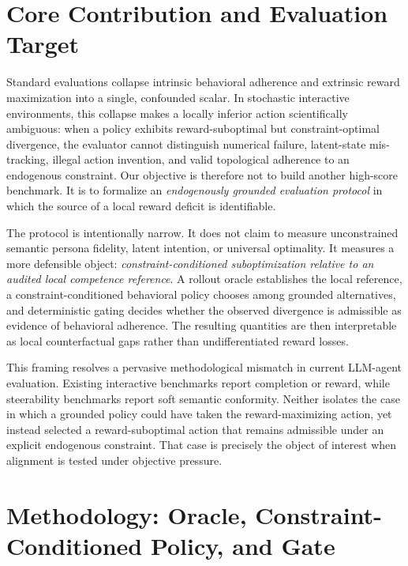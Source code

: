 
\section{Core Contribution and Evaluation Target}

Standard evaluations collapse intrinsic behavioral adherence and extrinsic reward maximization into a single, confounded scalar. In stochastic interactive environments, this collapse makes a locally inferior action scientifically ambiguous: when a policy exhibits reward-suboptimal but constraint-optimal divergence, the evaluator cannot distinguish numerical failure, latent-state mis-tracking, illegal action invention, and valid topological adherence to an endogenous constraint. Our objective is therefore not to build another high-score benchmark. It is to formalize an \emph{endogenously grounded evaluation protocol} in which the source of a local reward deficit is identifiable.

The protocol is intentionally narrow. It does not claim to measure unconstrained semantic persona fidelity, latent intention, or universal optimality. It measures a more defensible object: \emph{constraint-conditioned suboptimization relative to an audited local competence reference}. A rollout oracle establishes the local reference, a constraint-conditioned behavioral policy chooses among grounded alternatives, and deterministic gating decides whether the observed divergence is admissible as evidence of behavioral adherence. The resulting quantities are then interpretable as local counterfactual gaps rather than undifferentiated reward losses.

This framing resolves a pervasive methodological mismatch in current LLM-agent evaluation. Existing interactive benchmarks report completion or reward, while steerability benchmarks report soft semantic conformity. Neither isolates the case in which a grounded policy could have taken the reward-maximizing action, yet instead selected a reward-suboptimal action that remains admissible under an explicit endogenous constraint. That case is precisely the object of interest when alignment is tested under objective pressure.

\section{Methodology: Oracle, Constraint-Conditioned Policy, and Gate}

